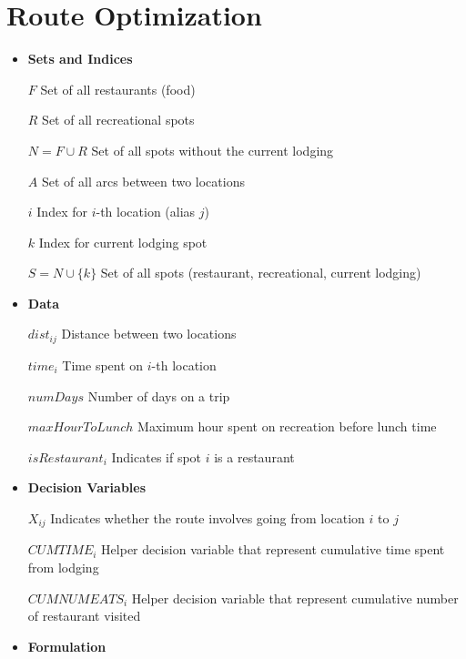 \documentclass{article}
\newcommand\tabb{\tabto{10em}}
\newcommand\idt{\hspace{2mm}}
\begin{document}
	\pagebreak

	\section*{Route Optimization}
	
	\begin{itemize}
		\item \textbf{Sets and Indices} 
		
		\idt $F$ \tabb Set of all restaurants (food)
		
		\idt $R$ \tabb Set of all recreational spots
		
		\idt $N = F \cup R$ \tabb Set of all spots without the current lodging
		
		\idt $A$ \tabb Set of all arcs between two locations
		
		\idt $i$ \tabb Index for $i$-th location (alias $j$)
		
		\idt $k$ \tabb Index for current lodging spot
		
		\idt $S = N \cup \{k\}$ \tabb Set of all spots (restaurant, recreational, current lodging)
		
		\item \textbf{Data}
		
		\idt $dist_{ij}$ \tabb Distance between two locations
		
		\idt $time_{i}$ \tabb Time spent on $i$-th location
		
		\idt $numDays$ \tabb Number of days on a trip
		
		\idt $maxHourToLunch$ \tabb Maximum hour spent on recreation before lunch time
		
		\idt $isRestaurant_{i}$ \tabb Indicates if spot $i$ is a restaurant

		\item \textbf{Decision Variables}
		
		\idt $X_{ij}$ \tabb Indicates whether the route involves going from location $i$ to $j$
		
		\idt $CUMTIME_{i}$ \tabb Helper decision variable that represent cumulative time spent from lodging
		
		\idt $CUMNUMEATS_{i}$ \tabb Helper decision variable that represent cumulative number of restaurant visited
		
		\item \textbf{Formulation}
		

\end{itemize}
\end{document}
